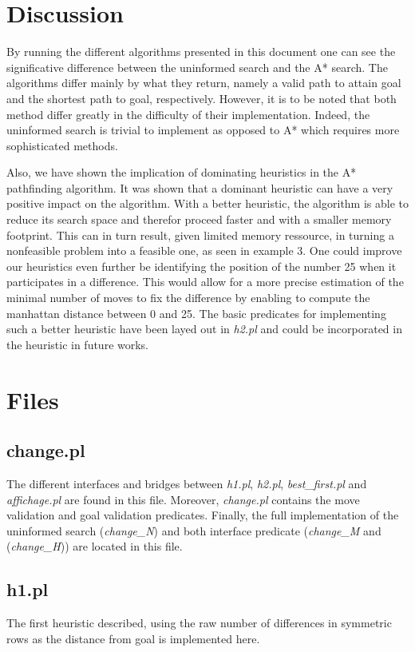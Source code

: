 \documentclass[12pt]{article}
\begin{document}
\section{Discussion}
By running the different algorithms presented in this document one can see the significative difference between the uninformed search and the A* search.  The algorithms differ mainly by what they return, namely a valid path to attain goal and the shortest path to goal, respectively.  However, it is to be noted that both method differ greatly in the difficulty of their implementation.  Indeed, the uninformed search is trivial to implement as opposed to A* which requires more sophisticated methods.

Also, we have shown the implication of dominating heuristics in the A* pathfinding algorithm.  It was shown that a dominant heuristic can have a very positive impact on the algorithm.  With a better heuristic, the algorithm is able to reduce its search space and therefor proceed faster and with a smaller memory footprint.  This can in turn result, given limited memory ressource, in turning a nonfeasible problem into a feasible one, as seen in example 3.  One could improve our heuristics even further be identifying the position of the number 25 when it participates in a difference.  This would allow for a more precise estimation of the minimal number of moves to fix the difference by enabling to compute the manhattan distance between 0 and 25.  The basic predicates for implementing such a better heuristic have been layed out in \textit{h2.pl} and could be incorporated in the heuristic in future works.

\section{Files}
\subsection{change.pl}
The different interfaces and bridges between \textit{h1.pl}, \textit{h2.pl}, \textit{best\_first.pl} and \textit{affichage.pl} are found in this file. Moreover, \textit{change.pl} contains the move validation and goal validation predicates.  Finally, the full implementation of the uninformed search (\textit{change\_N}) and both interface predicate (\textit{change\_M} and (\textit{change\_H})) are located in this file. 
\subsection{h1.pl}
The first heuristic described, using the raw number of differences in symmetric rows as the distance from goal is implemented here.
\end{document}
